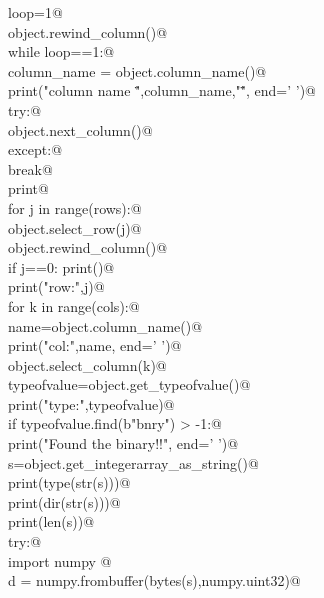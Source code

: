 \documentclass[10pt,a4paper,twoside,notitlepage]{article}
\begin{document}
\begin{flushleft}
\begin{minipage}{\linewidth}
\begin{list}{}{}
\mbox{}\verb@    loop=1@\\
\mbox{}\verb@    object.rewind_column()@\\
\mbox{}\verb@    while loop==1:@\\
\mbox{}\verb@        column_name = object.column_name()@\\
\mbox{}\verb@        print("column name \"",column_name,"\"", end=' ')@\\
\mbox{}\verb@        try:@\\
\mbox{}\verb@           object.next_column()@\\
\mbox{}\verb@        except:@\\
\mbox{}\verb@           break@\\
\mbox{}\verb@    print@\\
\mbox{}\verb@    for j in range(rows):@\\
\mbox{}\verb@        object.select_row(j)@\\
\mbox{}\verb@        object.rewind_column()@\\
\mbox{}\verb@        if j==0: print()@\\
\mbox{}\verb@        print("row:",j)@\\
\mbox{}\verb@        for k in range(cols):@\\
\mbox{}\verb@            name=object.column_name()@\\
\mbox{}\verb@            print("col:",name, end=' ')@\\
\mbox{}\verb@            object.select_column(k)@\\
\mbox{}\verb@            typeofvalue=object.get_typeofvalue()@\\
\mbox{}\verb@            print("type:",typeofvalue)@\\
\mbox{}\verb@            if typeofvalue.find(b"bnry") > -1:@\\
\mbox{}\verb@                print("Found the binary!!", end=' ')@\\
\mbox{}\verb@                s=object.get_integerarray_as_string()@\\
\mbox{}\verb@                print(type(str(s)))@\\
\mbox{}\verb@                print(dir(str(s)))@\\
\mbox{}\verb@                print(len(s))@\\
\mbox{}\verb@                try:@\\
\mbox{}\verb@                   import numpy @\\
\mbox{}\verb@                   d = numpy.frombuffer(bytes(s),numpy.uint32)@\\

\end{list}
\end{minipage}
\end{flushleft}
\end{document}
